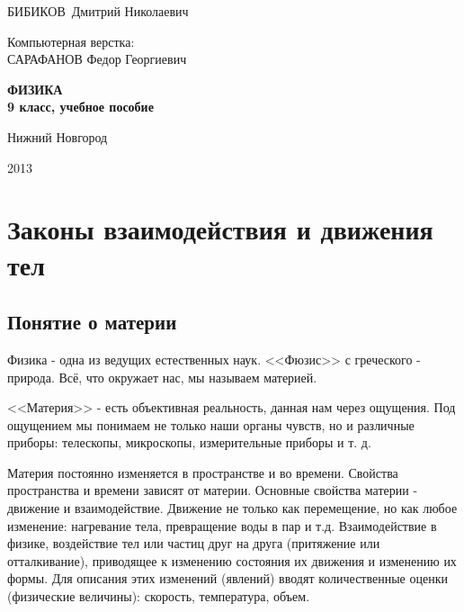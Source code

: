 \documentclass[a6paper, 11pt]{diss_4}
\renewcommand{\'}{\,'}
\begin{document}
\begin{titlepage}
\vspace*{1cm}
\begin{center}

 БИБИКОВ\ Дмитрий Николаевич
\vspace{1mm}

 Компьютерная верстка: \\
\vspace{2mm}
 САРАФАНОВ Федор Георгиевич
\vspace{3mm}

\end{center}

\vspace{2cm}

\begin{center}
 \bf
\Huge{  ФИЗИКА  }   \\
\large{ 9 класс, учебное пособие}
\end{center}

\vfill

\begin{center}
Нижний Новгород

2013
\end{center}
\end{titlepage}
\addtocounter{page}{1}
\tableofcontents
\chapter{Законы взаимодействия и движения тел}
\section{Понятие о материи}

 Физика - одна из ведущих естественных наук. <<Фюзис>> с греческого - природа.
Всё, что окружает нас, мы называем материей.

  <<Материя>> - есть объективная реальность, данная нам через ощущения. Под
ощущением мы понимаем не только наши органы чувств, но и различные приборы:
телескопы, микроскопы, измерительные приборы и т. д.

  Материя постоянно изменяется в пространстве и во времени. Свойства
пространства и времени зависят от материи. Основные свойства материи -
движение и взаимодействие. Движение не только как перемещение, но как любое
изменение: нагревание тела, превращение воды в пар и т.д. Взаимодействие в
физике, воздействие тел или частиц друг на друга (притяжение или
отталкивание), приводящее к изменению состояния их движения и изменению их
формы. Для описания этих изменений (явлений) вводят количественные оценки
(физические величины): скорость, температура, объем.
\end{document}
